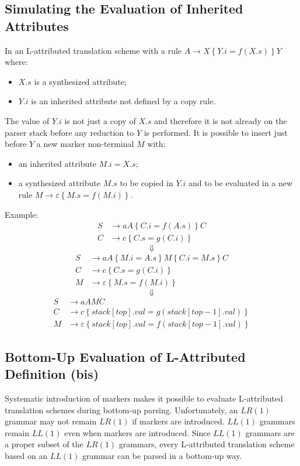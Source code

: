 \subsection{Simulating the Evaluation of Inherited Attributes}
In an L-attributed translation scheme with a rule $A \to X\left\{Y.i = f(X.s)\right\}Y$ where:
\begin{itemize}
	\item $X.s$ is a synthesized attribute;
	\item $Y.i$ is an inherited attribute not defined by a copy rule.
\end{itemize}
The value of $Y.i$ is not just a copy of $X.s$ and therefore it is not already on the parser stack before any reduction to $Y$ is performed.
It is possible to insert just before $Y$ a new marker non-terminal $M$ with:
\begin{itemize}
	\item an inherited attribute $M.i = X.s$;
	\item a synthesized attribute $M.s$ to be copied in $Y.i$ and to be evaluated in a new rule $M \to \varepsilon \left\{M.s = f(M.i)\right\}$.
\end{itemize}
Example:
\begin{align*}
	S &\to aA \left\{C.i = f(A.s)\right\}C \\
	C &\to c \left\{C.s = g(C.i)\right\}
\end{align*}
$$
	\Downarrow
$$
\begin{align*}
	S &\to aA \left\{M.i = A.s\right\}M\left\{C.i = M.s\right\}C \\
	C &\to c \left\{C.s = g(C.i)\right\} \\
	M &\to \varepsilon \left\{M.s = f(M.i)\right\}
\end{align*}
$$
	\Downarrow
$$
\begin{align*}
	S &\to aAMC \\
	C &\to c \left\{stack[top].val = g(stack[top - 1].val)\right\} \\
	M &\to \varepsilon \left\{stack[top].val = f(stack[top - 1].val)\right\}
\end{align*}

\subsection{Bottom-Up Evaluation of L-Attributed Definition (bis)}
Systematic introduction of markers makes it possible to evaluate L-attributed translation schemes during bottom-up parsing.
Unfortunately, an $LR(1)$ grammar may not remain $LR(1)$ if markers are introduced.
$LL(1)$ grammars remain $LL(1)$ even when markers are introduced.
Since $LL(1)$ grammars are a proper subset of the $LR(1)$ grammars, every L-attributed translation scheme based on an $LL(1)$ grammar can be parsed in a bottom-up way.